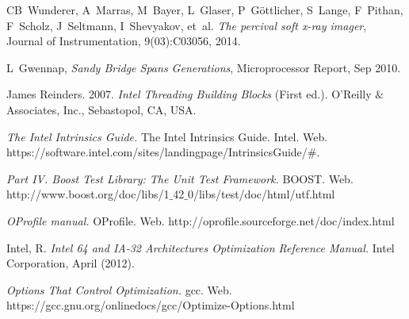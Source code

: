 \documentclass[journal]{IEEEtran}
\begin{document}
\begin{thebibliography}{7}

CB~Wunderer, A~Marras, M~Bayer, L~Glaser, P~G{\"o}ttlicher, S~Lange, F~Pithan,
  F~Scholz, J~Seltmann, I~Shevyakov, et~al.
\emph{The percival soft x-ray imager}, Journal of Instrumentation, 9(03):C03056, 2014.

L~Gwennap,
\emph{Sandy Bridge Spans Generations}, Microprocessor Report, Sep 2010.


James Reinders. 2007. \emph{Intel Threading Building Blocks} (First ed.). O'Reilly $\&$ Associates, Inc., Sebastopol, CA, USA. 

\emph{The Intel Intrinsics Guide.} The Intel Intrinsics Guide. Intel. Web. https://software.intel.com/sites/landingpage/IntrinsicsGuide/$\#$.

\emph{Part IV. Boost Test Library: The Unit Test Framework.} BOOST. Web. http://www.boost.org/doc/libs/1$\_$42$\_$0/libs/test/doc/html/utf.html

\emph{OProfile manual.} OProfile. Web. http://oprofile.sourceforge.net/doc/index.html

Intel, R. \emph{Intel 64 and IA-32 Architectures Optimization Reference Manual.} Intel Corporation, April (2012).

\emph{Options That Control Optimization.} gcc. Web. https://gcc.gnu.org/onlinedocs/gcc/Optimize-Options.html

\end{thebibliography}
\end{document}
